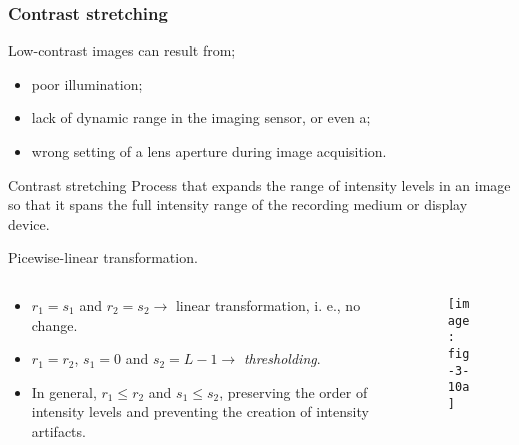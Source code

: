\subsubsection{Contrast stretching}


\begin{frame}
Low-contrast images can result from;
\begin{itemize}
\item poor illumination;
\item lack of dynamic range in the imaging sensor, or even a;
\item wrong setting of a lens aperture
during image acquisition.
\end{itemize}
\begin{block}{Contrast stretching}
Process that expands the range of intensity levels in an image so that it spans the full intensity range of the recording medium or display device.
\end{block}
\end{frame}


\begin{frame}
Picewise-linear transformation.
\begin{columns}
\begin{column}{.5\textwidth}
\begin{itemize}
\item $r_{1} = s_{1}$ and $r_{2} = s_{2} \rightarrow$ linear transformation, i. e., no change.
\item $r_{1} = r_{2}$, $s_{1} = 0$ and $s_{2} = L-1 \rightarrow$ \textit{thresholding}.
\item In general, $r_{1} \leq r_{2}$ and $s_{1} \leq s_{2}$, preserving the order of intensity levels and preventing the creation of intensity artifacts.
\end{itemize}
\end{column}
\begin{column}{.5\textwidth}
\begin{figure}
\centering
\texttt{[image: fig-3-10a]}
\end{figure}
\end{column}
\end{columns}
\end{frame}


